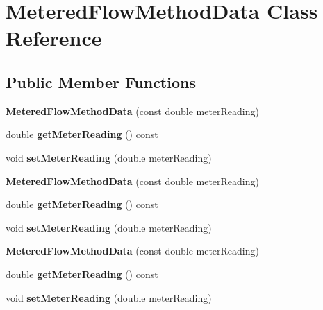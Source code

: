 \hypertarget{class_metered_flow_method_data}{}\section{Metered\+Flow\+Method\+Data Class Reference}
\label{class_metered_flow_method_data}
\subsection*{Public Member Functions}
\begin{DoxyCompactItemize}
\item 
\mbox{\label{class_metered_flow_method_data_abeec5fb37da7ee0e86aeff91483c95be}} 
{\bfseries Metered\+Flow\+Method\+Data} (const double meter\+Reading)
\item 
\mbox{\label{class_metered_flow_method_data_af9611b8829cdeb87e3fa52f52c415129}} 
double {\bfseries get\+Meter\+Reading} () const
\item 
\mbox{\label{class_metered_flow_method_data_a08d6153fd061bc115f7eee76b82fef5e}} 
void {\bfseries set\+Meter\+Reading} (double meter\+Reading)
\item 
\mbox{\label{class_metered_flow_method_data_abeec5fb37da7ee0e86aeff91483c95be}} 
{\bfseries Metered\+Flow\+Method\+Data} (const double meter\+Reading)
\item 
\mbox{\label{class_metered_flow_method_data_af9611b8829cdeb87e3fa52f52c415129}} 
double {\bfseries get\+Meter\+Reading} () const
\item 
\mbox{\label{class_metered_flow_method_data_a08d6153fd061bc115f7eee76b82fef5e}} 
void {\bfseries set\+Meter\+Reading} (double meter\+Reading)
\item 
\mbox{\label{class_metered_flow_method_data_abeec5fb37da7ee0e86aeff91483c95be}} 
{\bfseries Metered\+Flow\+Method\+Data} (const double meter\+Reading)
\item 
\mbox{\label{class_metered_flow_method_data_af9611b8829cdeb87e3fa52f52c415129}} 
double {\bfseries get\+Meter\+Reading} () const
\item 
\mbox{\label{class_metered_flow_method_data_a08d6153fd061bc115f7eee76b82fef5e}} 
void {\bfseries set\+Meter\+Reading} (double meter\+Reading)
\end{DoxyCompactItemize}



